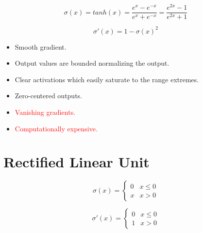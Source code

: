\documentclass{article}
\begin{document}
\begin{equation}
\sigma(x) = tanh(x) = \frac{e^x - e^{-x}}{e^x + e^{-x}} = \frac{e^{2x} -1}{e^{2x} + 1}
\end{equation}

\begin{equation}
\sigma'(x) = 1 - \sigma(x)^2
\end{equation}

\begin{itemize}
  \item Smooth gradient.
  \item Output values are bounded normalizing the output.
  \item Clear activations which easily saturate to the range extremes.
  \item Zero-centered outputs.
  \item \textcolor{red}{Vanishing gradients.} 
  \item \textcolor{red}{Computationally expensive.}
\end{itemize}

\clearpage

\section{Rectified Linear Unit}

\begin{figure}[!htb]
  \centering
\end{figure}

\begin{equation}
\sigma(x) =
  \begin{cases}
    0 & x \leq 0\\
    x & x > 0
  \end{cases}
\end{equation}

\begin{equation}
\sigma'(x) =
  \begin{cases}
    0 & x \leq 0\\
    1 & x > 0
  \end{cases}
\end{equation}
\end{document}
